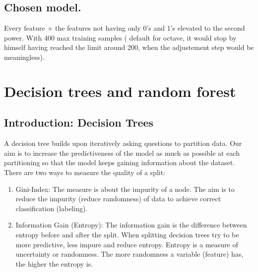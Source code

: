 \documentclass{article}
\begin{document}
\subsection{Chosen model.}
Every feature + the features not having only 0's and 1's elevated to the second power. With 400 max training samples ( default for octave, it would stop by himself having reached the limit around 200, when the adjustement step would be meaningless).

\section{Decision trees and random forest}
\subsection{Introduction: Decision Trees}
A decision tree builds upon iteratively asking questions to partition data.
Our aim is to increase the predictiveness of the model as much as possible at each partitioning so that the model keeps gaining information about the dataset.
There are two ways to measure the quality of a split:
\begin{enumerate}
	\item Gini-Index: The measure is about the impurity of a node. The aim is to reduce the impurity (reduce randomness) of data to achieve correct classification (labeling).
	\item Information Gain (Entropy):
	The information gain is the difference between entropy before and after the split.
	When splitting decision trees try to be more predictive, less impure and reduce entropy. Entropy is a measure of uncertainty or randomness. The more randomness a variable (feature) has, the higher the entropy is.  
\end{enumerate}
\end{document}
